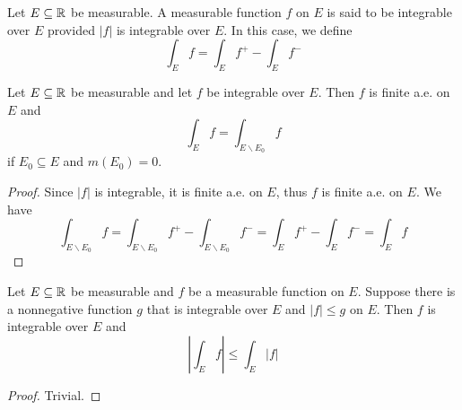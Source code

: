 \begin{definition}[Integrable]
    Let $E\subseteq\mathbb{R}$ be measurable. A measurable function $f$ on $E$ is said to be integrable over $E$ provided $|f|$ is integrable over $E$. In this case, we define 
    \begin{equation*}
        \int_E f = \int_E f^+ - \int_E f^-
    \end{equation*}
\end{definition}

\begin{proposition}
    Let $E\subseteq\mathbb{R}$ be measurable and let $f$ be integrable over $E$. Then $f$ is finite a.e. on $E$ and 
    \begin{equation*}
        \int_E f = \int_{E\backslash E_0} f
    \end{equation*}
    if $E_0\subseteq E$ and $m(E_0) = 0$.
\end{proposition}
\begin{proof}
    Since $|f|$ is integrable, it is finite a.e. on $E$, thus $f$ is finite a.e. on $E$. We have 
    \begin{equation*}
        \int_{E\backslash E_0} f = \int_{E\backslash E_0} f^+ - \int_{E\backslash E_0} f^- = \int_E f^+ - \int_E f^- = \int_E f
    \end{equation*}
\end{proof}

\begin{proposition}
    Let $E\subseteq\mathbb{R}$ be measurable and $f$ be a measurable function on $E$. Suppose there is a nonnegative function $g$ that is integrable over $E$ and $|f|\le g$ on $E$. Then $f$ is integrable over $E$ and 
    \begin{equation*}
        \left|\int_E f\right|\le\int_E|f|
    \end{equation*}
\end{proposition}
\begin{proof}
    Trivial.
\end{proof}

